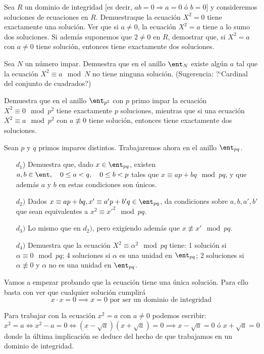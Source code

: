 \begin{problem}[7]

\ppart Sea $R$ un dominio de integridad [es decir, $ab=0\Rightarrow
a=0 \text{ ó } b=0$] y consideremos soluciones de ecuaciones en
$R$. Demuestraque la ecuación $X^2=0$ tiene exactamente una
solución. Ver que si $a\ne0$, la ecuación $X^2=a$ tiene a lo sumo
dos soluciones. Si además suponemos que $2\ne 0$ en $R$, demostrar
que, si  $X^2=a$ con $a\ne 0$ tiene solución, entonces tiene
exactamente dos soluciones.

\ppart Sea $N$ un número impar. Demuestra que en el anillo  $\ent_N$
existe algún $a$ tal que la ecuación  $X^2\equiv a \mod N$ no
tiene ninguna solución. (Sugerencia: ?`Cardinal del conjunto de
cuadrados?)

\ppart Demuestra que en el anillo $\ent_{p^2}$ con $p$ primo impar la
ecuación
 $X^2\equiv 0 \mod p^2$ tiene exactamente $p$ soluciones, mientras que si una
ecuación $X^2\equiv a \mod p^2$ con $a\not\equiv 0$ tiene
solución, entonces tiene exactamente dos soluciones.

\ppart Sean $p$ y $q$ primos impares distintos. Trabajaremos ahora en
el anillo $\ent_{pq}$.
\begin{itemize}
\item[$d_1$)] Demuestra que, dado $x\in\ent_{pq}$, existen $a,b\in\ent,\quad
0\le a<q,\quad 0\le b<p$ tales que $x\equiv ap+bq \mod pq$, y que
además $a$ y $b$ en estas condiciones son únicos.
\item[$d_2)$] Dados $x\equiv ap+bq, x'\equiv a'p+b'q \in\ent_{pq}$, da
condiciones sobre $a,b,a',b'$ que sean equivalentes a $x^2\equiv
{x'}^2 \mod pq$.
\item[$d_3)$] Lo mismo que en $d_2)$, pero exigiendo además que $x\not\equiv
x'\mod pq$.
\item[$d_4)$] Demuestra que la ecuación $X^2\equiv\alpha^2 \mod pq$ tiene:
1 solución si $\alpha\equiv0\mod pq$; 4 soluciones si $\alpha$ es
una unidad en $\ent_{pq}$;
 2 soluciones si $\alpha\not\equiv 0$ y $\alpha$ no es una unidad en
$\ent_{pq}$.
\end{itemize}
\solution


\spart

Vamos a empezar probando que la ecuación tiene una única solución. Para ello basta con ver que cualquier solución cumplirá
\[x\cdot x = 0 \implies x=0 \text{ por ser un dominio de integridad}\]

Para trabajar con la ecuación $x^2=a$ con $a\neq 0$ podemos escribir:
\[x^2=a\iff x^2-a=0 \iff (x-\sqrt{a})(x+\sqrt{a})=0 \implies x-\sqrt{a}=0 \text{ ó } x+\sqrt{a}=0\]
donde la última implicación se deduce del hecho de que trabajamos en un dominio de integridad.


\end{problem}
